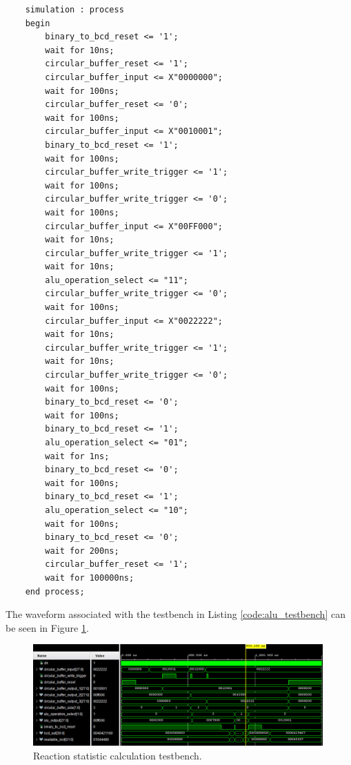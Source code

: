 \documentclass[11pt]{article}
\newenvironment{code}{\captionsetup{type=listing}}{}
\begin{document}
\begin{code}
\begin{verbatim}
    simulation : process
    begin
        binary_to_bcd_reset <= '1';
        wait for 10ns;
        circular_buffer_reset <= '1';
        circular_buffer_input <= X"0000000";
        wait for 100ns;
        circular_buffer_reset <= '0';
        wait for 100ns;
        circular_buffer_input <= X"0010001";
        binary_to_bcd_reset <= '1';
        wait for 100ns;
        circular_buffer_write_trigger <= '1';
        wait for 100ns;
        circular_buffer_write_trigger <= '0';
        wait for 100ns;
        circular_buffer_input <= X"00FF000";
        wait for 10ns;
        circular_buffer_write_trigger <= '1';
        wait for 10ns;
        alu_operation_select <= "11";
        circular_buffer_write_trigger <= '0';
        wait for 100ns;
        circular_buffer_input <= X"0022222";
        wait for 10ns;
        circular_buffer_write_trigger <= '1';
        wait for 10ns;
        circular_buffer_write_trigger <= '0';
        wait for 100ns;
        binary_to_bcd_reset <= '0';
        wait for 100ns;
        binary_to_bcd_reset <= '1';
        alu_operation_select <= "01";
        wait for 1ns;
        binary_to_bcd_reset <= '0';
        wait for 100ns;
        binary_to_bcd_reset <= '1';
        alu_operation_select <= "10";
        wait for 100ns;
        binary_to_bcd_reset <= '0';
        wait for 200ns;
        circular_buffer_reset <= '1';
        wait for 100000ns;
    end process;

  \end{verbatim}
  \captionsetup{belowskip=0pt}
  \label{code:alu_testbench}
\end{code}

\vspace*{1cm}

The waveform associated with the testbench in Listing \ref{code:alu_testbench} can be seen in Figure \ref{fig:alu_testbench_2}.

\begin{figure}[H]
  \centering
  \includegraphics[width=0.99\textwidth]{thing.jpeg}
  \caption{Reaction statistic calculation testbench.}
  \label{fig:alu_testbench_2}
\end{figure}
\end{document}
